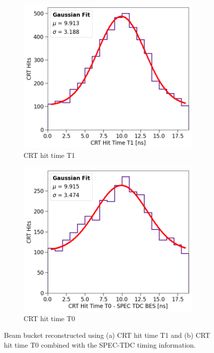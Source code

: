 \begin{figure}[ht!]
\begin{subfigure}[h]{0.495\linewidth}
\centering    
\includegraphics[width=\linewidth]{CRT_T1_Bucket}
\caption{CRT hit time T1}
\label{fig:beamBucket_T1}
\end{subfigure}%
\hfill
\begin{subfigure}[h]{0.495\linewidth}
\centering    
\includegraphics[width=\linewidth]{CRTT0_SPEC_Bucket}
\caption{CRT hit time T0}
\label{fig:beamBucket_T0}
\end{subfigure}
\caption[Reconstructed Beam Bucket Using CRT Sharps]{
Beam bucket reconstructed using (a) CRT hit time T1 and (b) CRT hit time T0 combined with the SPEC-TDC timing information. 
}
\label{fig:beamBucket}
\end{figure}

